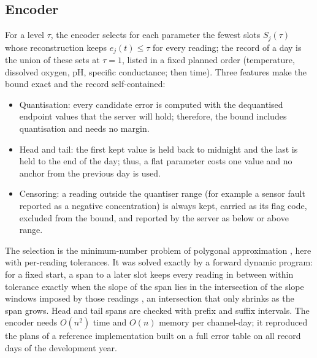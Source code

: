\subsection{Encoder}
\label{sec:encoder}
For a level $\tau$, the encoder selects for each parameter the fewest slots $S_j(\tau)$ whose reconstruction keeps $e_j(t) \le \tau$ for every reading; the record of a day is the union of these sets at $\tau = 1$, listed in a fixed planned order (temperature, dissolved oxygen, pH, specific conductance; then time). Three features make the bound exact and the record self-contained:
\begin{itemize}
  \item Quantisation: every candidate error is computed with the dequantised endpoint values that the server will hold; therefore, the bound includes quantisation and needs no margin.
  \item Head and tail: the first kept value is held back to midnight and the last is held to the end of the day; thus, a flat parameter costs one value and no anchor from the previous day is used.
  \item Censoring: a reading outside the quantiser range (for example a sensor fault reported as a negative concentration) is always kept, carried as its flag code, excluded from the bound, and reported by the server as below or above range.
\end{itemize}
The selection is the minimum-number problem of polygonal approximation \citep{imai1988}, here with per-reading tolerances. It was solved exactly by a forward dynamic program: for a fixed start, a span to a later slot keeps every reading in between within tolerance exactly when the slope of the span lies in the intersection of the slope windows imposed by those readings \citep{orourke1981}, an intersection that only shrinks as the span grows. Head and tail spans are checked with prefix and suffix intervals. The encoder needs $O(n^2)$ time and $O(n)$ memory per channel-day; it reproduced the plans of a reference implementation built on a full error table on all \nDaysDevAll{} record days of the development year.


